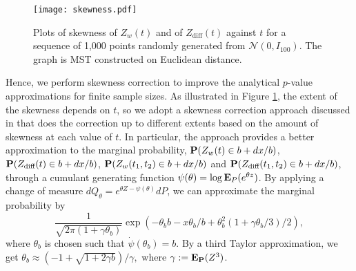 \documentclass[arxiv, preprint]{imsart}
\numberwithin{equation}{section}
\theoremstyle{plain}
\begin{document}
\begin{figure}[htp]
  \centering
	    \texttt{[image: skewness.pdf]}
      \vspace{-2mm}
	    \caption{\small Plots of skewness of $Z_w(t)$ and of $Z_\text{diff}(t)$ against $t$ for a sequence of 1,000 points randomly generated from $\mathcal{N}(0,I_{100})$. The graph is MST constructed on Euclidean distance.}
	    \label{fig:skew}
\end{figure}

Hence, we perform skewness correction to improve the analytical $p$-value approximations for finite sample sizes. As illustrated in Figure \ref{fig:skew}, the extent of the skewness depends on $t$, so we adopt a skewness correction approach discussed in \cite{chen2015graph} that does the correction up to different extents based on the amount of skewness at each value of $t$. In particular, the approach provides a better approximation to the marginal probability, $\mathbf{P}(Z_w(t) \in b+ dx /b)$, $\mathbf{P}(Z_\text{diff}(t) \in b+ dx /b)$, $\mathbf{P}(Z_w(t_1,t_2) \in b+ dx /b)$ and $\mathbf{P}(Z_\text{diff}(t_1,t_2) \in b+ dx /b)$,  through a cumulant generating function $\psi (\theta) = \log \mathbf{E}_P(e^{\theta z})$. By applying a change of measure $dQ_{\theta} = e^{\theta Z-\psi(\theta)}dP$, we can approximate the marginal probability by
\[ \frac{1}{\sqrt{2\pi (1 + \gamma \theta_b)}}\exp(-\theta_b b-x \theta_b/b + \theta^2_b(1+\gamma \theta_b/3)/2), \] 
where $\theta_b$ is chosen such that $\dot{\psi}(\theta_b) = b.$ By a third Taylor approximation, we get
$\theta_b \approx (-1 + \sqrt{1+2\gamma b})/\gamma, $
where $\gamma: = \mathbf{E}_{\mathbf{P}}(Z^3)$.
\end{document}
